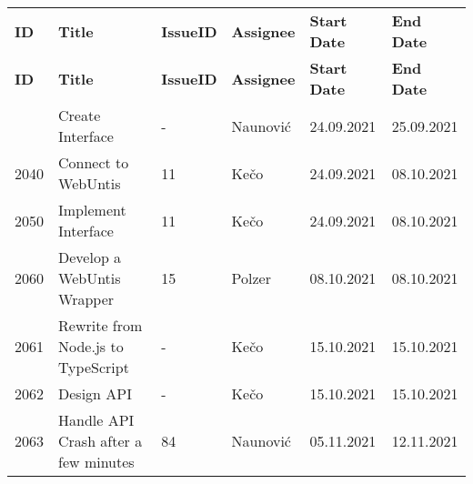 \begin{longtable}{|p{}|p{}|p{}|p{}|p{}|p{}|} \hline
    \textbf{ID} & \textbf{Title} & \textbf{Issue\-ID} & \textbf{Assignee} & \textbf{Start Date} & \textbf{End\- Date} \\ \hhline{|=|=|=|=|=|=|}
    \endfirsthead
    \hline
    \textbf{ID} & \textbf{Title} & \textbf{Issue\-ID} & \textbf{Assignee} & \textbf{Start Date} & \textbf{End\- Date} \\ \hhline{|=|=|=|=|=|=|}
    \endhead
    2030 & Create Interface & - & Naunović & 24.09.2021 & 25.09.2021 \\ \hline
    2040 & Connect to WebUntis & 11 & Kečo & 24.09.2021 & 08.10.2021 \\ \hline
    2050 & Implement Interface & 11 & Kečo & 24.09.2021 & 08.10.2021 \\ \hline
    2060 & Develop a WebUntis Wrapper & 15 & Polzer & 08.10.2021 & 08.10.2021 \\ \hline
    2061 & Rewrite from Node.js to TypeScript & - & Kečo & 15.10.2021 & 15.10.2021 \\ \hline
    2062 & Design API & - & Kečo & 15.10.2021 & 15.10.2021 \\ \hline
    2063 & Handle API Crash after a few minutes & 84 & Naunović & 05.11.2021 & 12.11.2021 \\ \hline
\end{longtable}


